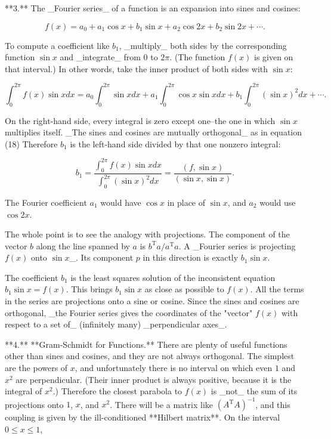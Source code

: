 

**3.** The _Fourier series_ of a function is an expansion into sines and cosines:

\[f(x)=a_{0}+a_{1}\cos x+b_{1}\sin x+a_{2}\cos 2x+b_{2}\sin 2x+\cdots.\]

To compute a coefficient like \(b_{1}\), _multiply_ both sides by the corresponding function \(\sin x\) and _integrate_ from \(0\) to \(2\pi\). (The function \(f(x)\) is given on that interval.) In other words, take the inner product of both sides with \(\sin x\):

\[\int_{0}^{2\pi}f(x)\sin xdx=a_{0}\int_{0}^{2\pi}\sin xdx+a_{1}\int_{0}^{2\pi} \cos x\sin xdx+b_{1}\int_{0}^{2\pi}(\sin x)^{2}dx+\cdots.\]

On the right-hand side, every integral is zero except one--the one in which \(\sin x\) multiplies itself. _The sines and cosines are mutually orthogonal_ as in equation (18) Therefore \(b_{1}\) is the left-hand side divided by that one nonzero integral:

\[b_{1}=\frac{\int_{0}^{2\pi}f(x)\sin xdx}{\int_{0}^{2\pi}(\sin x)^{2}dx}=\frac {(f,\sin x)}{(\sin x,\sin x)}.\]

The Fourier coefficient \(a_{1}\) would have \(\cos x\) in place of \(\sin x\), and \(a_{2}\) would use \(\cos 2x\).

The whole point is to see the analogy with projections. The component of the vector \(b\) along the line spanned by \(a\) is \(b^{\mathrm{T}}a/a^{\mathrm{T}}a\). A _Fourier series is projecting \(f(x)\) onto \(\sin x\)_. Its component \(p\) in this direction is exactly \(b_{1}\sin x\).

The coefficient \(b_{1}\) is the least squares solution of the inconsistent equation \(b_{1}\sin x=f(x)\). This brings \(b_{1}\sin x\) as close as possible to \(f(x)\). All the terms in the series are projections onto a sine or cosine. Since the sines and cosines are orthogonal, _the Fourier series gives the coordinates of the "vector" \(f(x)\) with respect to a set of_ (infinitely many) _perpendicular axes_.

**4.** **Gram-Schmidt for Functions.** There are plenty of useful functions other than sines and cosines, and they are not always orthogonal. The simplest are the powers of \(x\), and unfortunately there is no interval on which even \(1\) and \(x^{2}\) are perpendicular. (Their inner product is always positive, because it is the integral of \(x^{2}\).) Therefore the closest parabola to \(f(x)\) is _not_ the sum of its projections onto \(1\), \(x\), and \(x^{2}\). There will be a matrix like \((A^{\mathrm{T}}A)^{-1}\), and this coupling is given by the ill-conditioned **Hilbert matrix**. On the interval \(0\leq x\leq 1\),

